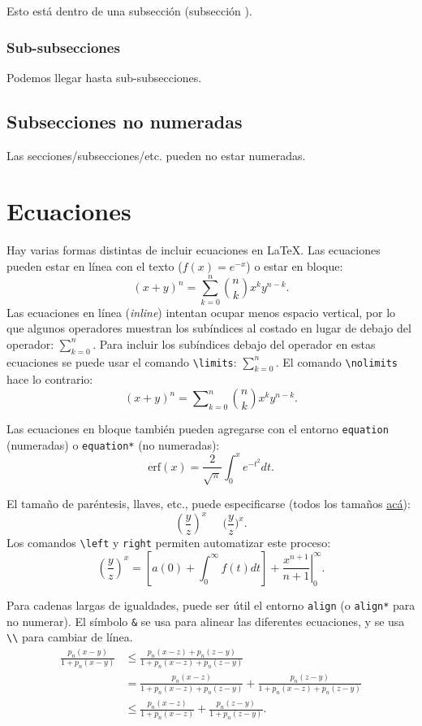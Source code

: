 \documentclass[12pt, spanish]{report}
\theoremstyle{definition} %
\theoremstyle{remark} %
\theoremstyle{plain} %
\theoremstyle{plain} %
\theoremstyle{plain} %
\theoremstyle{plain} %
\theoremstyle{plain} %
\theoremstyle{remark} %
\numberwithin{defn}{chapter}
\begin{document}
Esto está dentro de una subsección (subsección \thesubsection).

\subsubsection{Sub-subsecciones}

Podemos llegar hasta sub-subsecciones.

\subsection*{Subsecciones no numeradas}

Las secciones/subsecciones/etc. pueden no estar numeradas.


\section{Ecuaciones}

Hay varias formas distintas de incluir ecuaciones en \LaTeX. Las ecuaciones pueden estar en línea con el texto ($f(x) = e^{-x}$) o estar en bloque: 
\[
(x+y)^n = \sum_{k=0}^n \binom{n}{k} x^k y^{n-k}.
\]
Las ecuaciones en línea (\textit{inline}) intentan ocupar menos espacio vertical, por lo que algunos operadores muestran los subíndices al costado en lugar de debajo del operador: $\sum_{k=0}^n$. Para incluir los subíndices debajo del operador en estas ecuaciones se puede usar el comando \verb|\limits|: $\sum\limits_{k=0}^n$. El comando \verb|\nolimits| hace lo contrario:
\[
(x+y)^n = \sum\nolimits_{k=0}^n \binom{n}{k} x^k y^{n-k}.
\]

Las ecuaciones en bloque también pueden agregarse con el entorno \verb|equation| (numeradas) o \verb|equation*| (no numeradas):
\begin{equation}
    \text{erf}(x) = \frac{2}{\sqrt{\pi}} \int_0^x e^{-t^2} dt.
\end{equation}

El tamaño de paréntesis, llaves, etc., puede especificarse (todos los tamaños \href{www.overleaf.com/learn/latex/Brackets_and_Parentheses}{acá}): \[
    (\frac{y}{z})^x\;\;\;\;\;\Big(\frac{y}{z}\Big)^x.
\]
Los comandos \verb|\left| y \verb|right| permiten automatizar este proceso:
\[
    \left(\frac{y}{z}\right)^x = \left[ a(0) + \int_0^\infty f(t)dt\right] + \left. \frac{x^{n+1}}{n+1} \right|_0^\infty.
\]

Para cadenas largas de igualdades, puede ser útil el entorno \verb|align| (o \verb|align*| para no numerar). El símbolo \verb|&| se usa para alinear las diferentes ecuaciones, y se usa \verb|\\| para cambiar de línea.
\begin{align*}
    \frac{p_n(x - y)}{1 + p_n(x - y)} &\leq \frac{p_n(x - z) + p_n(z - y)}{1 + p_n(x - z) + p_n(z - y)} \\
    &= \frac{p_n(x - z)}{1 + p_n(x - z) + p_n(z - y)} + \frac{p_n(z - y)}{1 + p_n(x - z) + p_n(z - y)} \\
    &\leq \frac{p_n(x - z)}{1 + p_n(x - z)} + \frac{p_n(z - y)}{1 + p_n(z - y)}.
\end{align*}
\end{document}
